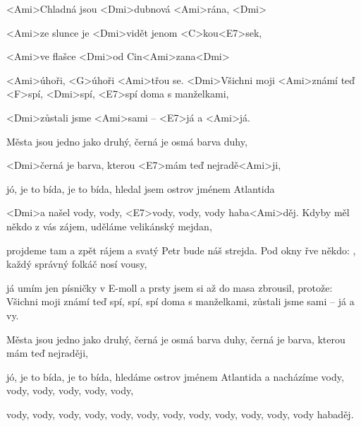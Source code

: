 
\zs
<Ami>Chladná jsou <Dmi>dubnová <Ami>rána, <Dmi>

<Ami>ze slunce je <Dmi>vidět jenom <C>kou<E7>sek,

<Ami>ve flašce <Dmi>od Cin<Ami>zana<Dmi> 

<Ami>úhoři, <G>úhoři <Ami>třou se.
\ks
\zr
<Dmi>Všichni moji <Ami>známí teď <F>spí, <Dmi>spí, 
<E7>spí doma s manželkami,

<Dmi>zůstali jsme <Ami>sami – <E7>já a <Ami>já.

Města jsou jedno jako druhý, černá je osmá barva duhy,

<Dmi>černá je barva, kterou <E7>mám teď nejradě<Ami>ji,

jó, je to bída, je to bída, hledal jsem ostrov jménem Atlantida

<Dmi>a našel vody, vody, <E7>vody, vody, vody haba<Ami>děj.
\kr
\zs
Kdyby měl někdo z vás zájem,
uděláme velikánský mejdan,

projdeme tam a zpět rájem
a svatý Petr bude náš strejda.
\ks
\zr \kr
\zs
Pod okny řve někdo: ,
každý správný folkáč nosí vousy,

já umím jen písničky v E-moll
a prsty jsem si až do masa zbrousil, protože:
\ks
\zr
Všichni moji známí teď spí, spí, spí doma s manželkami,
zůstali jsme sami -- já a vy.

Města jsou jedno jako druhý, černá je osmá barva duhy,
černá je barva, kterou mám teď nejraději,

jó, je to bída, je to bída, hledáme ostrov jménem Atlantida
a nacházíme vody, vody, vody, vody, vody, vody,

vody, vody, vody, vody, vody, vody,
vody, vody, vody, vody, vody, vody habaděj.
\kr
\kp
